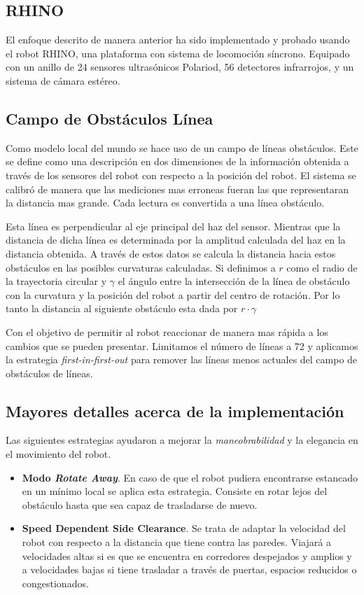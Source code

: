 \documentclass[10pt]{article}
\begin{document}
\subsection{RHINO}
El enfoque descrito de manera anterior ha sido implementado y probado usando el robot RHINO, una plataforma con sistema de locomoción síncrono. Equipado con un anillo de 24 sensores ultrasónicos Polariod, 56 detectores infrarrojos, y un sistema de cámara estéreo.

\subsection{Campo de Obstáculos Línea}
Como modelo local del mundo se hace uso de un campo de líneas obstáculos. Este se define como una descripción en dos dimensiones de la información obtenida a través de los sensores del robot con respecto a la posición del robot. El sistema se calibró de manera que las mediciones mas erroneas fueran las que representaran la distancia mas grande. Cada lectura es convertida a una línea obstáculo. 

Esta línea es perpendicular al eje principal del haz del sensor. Mientras que la distancia de dicha línea es determinada por la amplitud calculada del haz en la distancia obtenida. A través de estos datos se calcula la distancia hacia estos obstáculos en las posibles curvaturas calculadas. Si definimos a \boldmath$r$ como el radio de la trayectoria circular  y \boldmath$\gamma$ el ángulo entre la intersección de la línea de obstáculo con la curvatura y la posición del robot a partir del centro de rotación. Por lo tanto la distancia al siguiente obstáculo esta dada por \boldmath$r \cdot \gamma$

Con el objetivo de permitir al robot reaccionar de manera mas rápida a los cambios que se pueden presentar. Limitamos el número de líneas a 72 y aplicamos la estrategia \emph{first-in-first-out} para remover las líneas menos actuales del campo de obstáculos de líneas. 

\subsection{Mayores detalles acerca de la implementación}
Las siguientes estrategias ayudaron a mejorar la \emph{maneobrabilidad} y la elegancia en el movimiento del robot.

\begin{itemize}
	\item \textbf{Modo \emph{Rotate Away}}. En caso de que el robot pudiera encontrarse estancado en un mínimo local se aplica esta estrategia. Consiste en rotar lejos del obstáculo hasta que sea capaz de trasladarse de nuevo.
	\item \textbf{Speed Dependent Side Clearance}. Se trata de adaptar la velocidad del robot con respecto a la distancia que tiene contra las paredes. Viajará a velocidades altas si es que se encuentra en corredores despejados y amplios y a velocidades bajas si tiene trasladar a través de puertas, espacios reducidos o congestionados.
\end{itemize}
\end{document}
